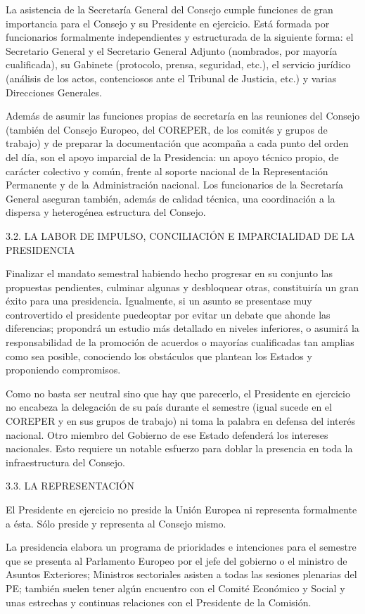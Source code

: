 \documentclass[10pt,a4paper]{article}
\begin{document}
La asistencia de la Secretaría General del Consejo cumple funciones de gran importancia para el Consejo y su Presidente en ejercicio. Está formada por funcionarios formalmente independientes y estructurada de la siguiente forma: el Secretario General y el Secretario General Adjunto (nombrados, por mayoría cualificada), su Gabinete (protocolo, prensa, seguridad, etc.), el servicio jurídico (análisis de los actos, contenciosos ante el Tribunal de Justicia, etc.) y varias Direcciones Generales.

Además de asumir las funciones propias de secretaría en las reuniones del Consejo (también del Consejo Europeo, del COREPER, de los comités y grupos de trabajo) y de preparar la documentación que acompaña a cada punto del orden del día, son el apoyo imparcial de la Presidencia: un apoyo técnico propio, de carácter colectivo y común, frente al soporte nacional de la Representación Permanente y de la Administración nacional. Los funcionarios de la Secretaría General aseguran también, además de calidad técnica, una coordinación a la dispersa y heterogénea estructura del Consejo.

3.2. LA LABOR DE IMPULSO, CONCILIACIÓN E IMPARCIALIDAD DE LA PRESIDENCIA

Finalizar el mandato semestral habiendo hecho progresar en su conjunto las propuestas pendientes, culminar algunas y desbloquear otras, constituiría un gran éxito para una presidencia. Igualmente, si un asunto se presentase muy controvertido el presidente puedeoptar por evitar un debate que ahonde las diferencias; propondrá un estudio más detallado en niveles inferiores, o asumirá la responsabilidad de la promoción de acuerdos o mayorías cualificadas tan amplias como sea posible, conociendo los obstáculos que plantean los Estados y proponiendo compromisos. 

Como no basta ser neutral sino que hay que parecerlo, el Presidente en ejercicio no encabeza la delegación de su país durante el semestre (igual sucede en el COREPER y en sus grupos de trabajo) ni toma la palabra en defensa del interés nacional. Otro miembro del Gobierno de ese Estado defenderá los intereses nacionales. Esto requiere un notable esfuerzo para doblar la presencia en toda la infraestructura del Consejo.

3.3. LA REPRESENTACIÓN

El Presidente en ejercicio no preside la Unión Europea ni representa formalmente a ésta. Sólo preside y representa al Consejo mismo.

La presidencia elabora un programa de prioridades e intenciones para el semestre que se presenta al Parlamento Europeo por el jefe del gobierno o el ministro de Asuntos Exteriores; Ministros sectoriales asisten a todas las sesiones plenarias del PE; también suelen tener algún encuentro con el Comité Económico y Social y unas estrechas y continuas relaciones con el Presidente de la Comisión.
\end{document}
